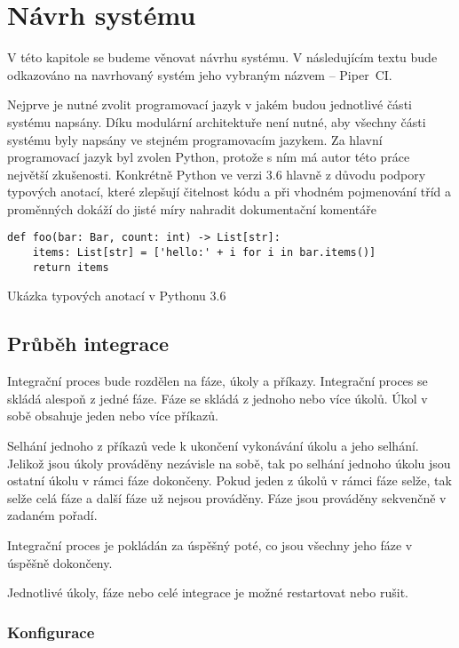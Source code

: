 \chapter{Návrh systému}

V této kapitole se budeme věnovat návrhu systému.
V následujícím textu bude odkazováno na navrhovaný systém jeho vybraným názvem -- Piper~CI.

Nejprve je nutné zvolit programovací jazyk v jakém budou jednotlivé části systému napsány.
Díku modulární architektuře není nutné, aby všechny části systému byly napsány ve stejném programovacím jazykem.
Za hlavní programovací jazyk byl zvolen Python, protože s ním má autor této práce největší zkušenosti.
Konkrétně Python ve verzi 3.6 hlavně z důvodu podpory typových anotací, které zlepšují čitelnost kódu a při vhodném pojmenování tříd a proměnných dokáží do jisté míry nahradit dokumentační komentáře

\begin{listing}[ht]
\begin{verbatim}
def foo(bar: Bar, count: int) -> List[str]:
    items: List[str] = ['hello:' + i for i in bar.items()]
    return items
\end{verbatim}
\caption{Ukázka typových anotací v Pythonu 3.6}
\end{listing}

\section{Průběh integrace}

Integrační proces bude rozdělen na fáze, úkoly a příkazy.
Integrační proces se skládá alespoň z jedné fáze.
Fáze se skládá z jednoho nebo více úkolů.
Úkol v sobě obsahuje jeden nebo více příkazů.

Selhání jednoho z příkazů vede k ukončení vykonávání úkolu a jeho selhání.
Jelikož jsou úkoly prováděny nezávisle na sobě, tak po selhání jednoho úkolu jsou ostatní úkolu v rámci fáze dokončeny.
Pokud jeden z úkolů v rámci fáze selže, tak selže celá fáze a další fáze už nejsou prováděny.
Fáze jsou prováděny sekvenčně v zadaném pořadí.

Integrační proces je pokládán za úspěšný poté, co jsou všechny jeho fáze v úspěšně dokončeny.

Jednotlivé úkoly, fáze nebo celé integrace je možné restartovat nebo rušit.

\subsection{Konfigurace}

